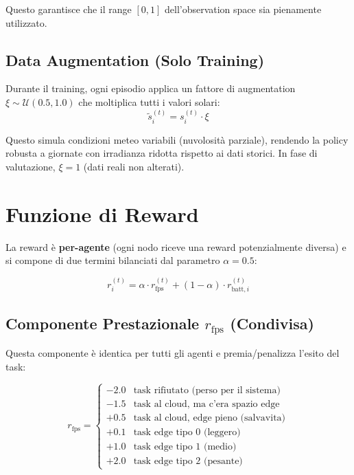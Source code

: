 \documentclass[11pt,a4paper]{article}
\begin{document}
Questo garantisce che il range $[0, 1]$ dell'observation space sia pienamente utilizzato.

\subsection{Data Augmentation (Solo Training)}

Durante il training, ogni episodio applica un fattore di augmentation $\xi \sim \mathcal{U}(0.5, 1.0)$ che moltiplica tutti i valori solari:
\begin{equation}
\tilde{s}_i^{(t)} = s_i^{(t)} \cdot \xi
\end{equation}

Questo simula condizioni meteo variabili (nuvolosit\`a parziale), rendendo la policy robusta a giornate con irradianza ridotta rispetto ai dati storici. In fase di valutazione, $\xi = 1$ (dati reali non alterati).

\section{Funzione di Reward}

La reward \`e \textbf{per-agente} (ogni nodo riceve una reward potenzialmente diversa) e si compone di due termini bilanciati dal parametro $\alpha = 0.5$:

\begin{equation}
r_i^{(t)} = \alpha \cdot r_{\text{fps}}^{(t)} + (1 - \alpha) \cdot r_{\text{batt},i}^{(t)}
\label{eq:reward}
\end{equation}

\subsection{Componente Prestazionale $r_{\text{fps}}$ (Condivisa)}

Questa componente \`e identica per tutti gli agenti e premia/penalizza l'esito del task:

\begin{equation}
r_{\text{fps}} =
\begin{cases}
-2.0 & \text{task rifiutato (perso per il sistema)} \\
-1.5 & \text{task al cloud, ma c'era spazio edge} \\
+0.5 & \text{task al cloud, edge pieno (salvavita)} \\
+0.1 & \text{task edge tipo 0 (leggero)} \\
+1.0 & \text{task edge tipo 1 (medio)} \\
+2.0 & \text{task edge tipo 2 (pesante)}
\end{cases}
\end{equation}
\end{document}
